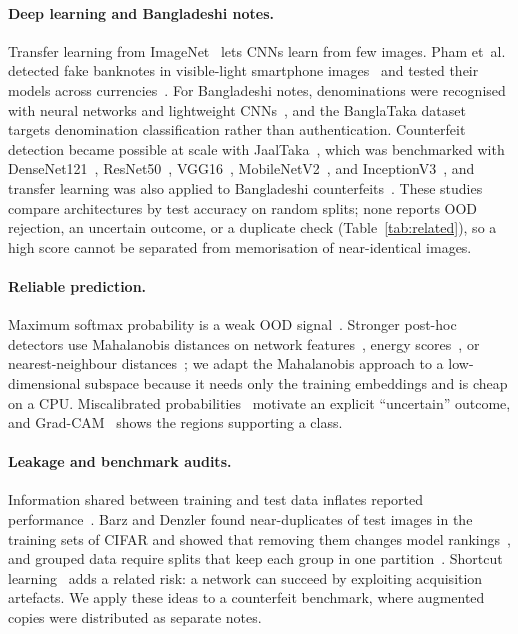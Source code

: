 \documentclass[pdflatex,sn-mathphys-num]{sn-jnl}
\begin{document}
\paragraph{Deep learning and Bangladeshi notes.} Transfer learning from
ImageNet~\cite{deng2009imagenet,yosinski2014transferable} lets CNNs learn from few
images. Pham et~al. detected fake banknotes in visible-light smartphone
images~\cite{pham2020} and tested their models across currencies~\cite{pham2022}. For Bangladeshi notes, denominations were recognised with neural
networks and lightweight CNNs~\cite{jahangir2007,linkon2020}, and the BanglaTaka
dataset~\cite{nuhash2025banglataka} targets denomination classification rather than
authentication. Counterfeit detection became possible at scale with
JaalTaka~\cite{piyas2025jaaltaka}, which was benchmarked with
DenseNet121~\cite{huang2017densenet}, ResNet50~\cite{he2016resnet},
VGG16~\cite{simonyan2015vgg}, MobileNetV2~\cite{sandler2018mobilenetv2}, and
InceptionV3~\cite{szegedy2016inception}, and transfer learning was also applied to
Bangladeshi counterfeits~\cite{tabassum2025}.
These studies compare architectures by test accuracy on random splits; none reports
OOD rejection, an uncertain outcome, or a duplicate check (Table~\ref{tab:related}), so a
high score cannot be separated from memorisation of near-identical images.

\paragraph{Reliable prediction.} Maximum softmax probability is a weak OOD
signal~\cite{hendrycks2017baseline}. Stronger post-hoc detectors use Mahalanobis
distances on network features~\cite{lee2018mahalanobis}, energy
scores~\cite{liu2020energy}, or nearest-neighbour distances~\cite{sun2022knn}; we adapt
the Mahalanobis approach to a low-dimensional subspace because it needs only the training
embeddings and is cheap on a CPU. Miscalibrated
probabilities~\cite{guo2017calibration} motivate an explicit ``uncertain'' outcome, and
Grad-CAM~\cite{selvaraju2017gradcam} shows the regions supporting a class.

\paragraph{Leakage and benchmark audits.} Information shared between training and test
data inflates reported performance~\cite{kaufman2012leakage,kapoor2023leakage}.
Barz and Denzler found near-duplicates of test images in the training sets of CIFAR and
showed that removing them changes model rankings~\cite{barz2020cifair}, and grouped data
require splits that keep each group in one partition~\cite{roberts2017cv}. Shortcut
learning~\cite{geirhos2020shortcut} adds a related risk: a network can succeed by
exploiting acquisition artefacts. We apply these ideas to a counterfeit benchmark, where
augmented copies were distributed as separate notes.
\end{document}
